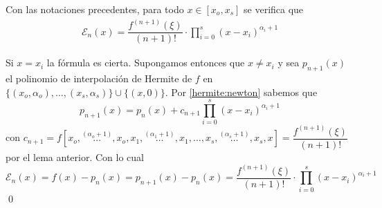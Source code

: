       \begin{teo}
        Con las notaciones precedentes, para todo $x\in[x_o,x_s]$ se verifica que
        \begin{align}
          \mathcal{E}_n(x)=\dfrac{f^{(n+1)}(\xi)}{(n+1)!}\cdot \prod_{i=0}^s(x-x_i)^{\alpha_i+1}
          \label{error:herm}
        \end{align}
        
      \end{teo}
      \begin{dem}
        Si $x=x_i$ la fórmula es cierta. Supongamos entonces que $x\neq x_i$ y sea $p_{n+1}(x)$ el polinomio de interpolación de Hermite de $f$ en $\{(x_o,\alpha_o),\ldots,(x_s,\alpha_s)\}\cup \{(x,0)\}$. Por \ref{hermite:newton} sabemos que
        $$p_{n+1}(x)=p_n(x)+c_{n+1}\prod_{i=0}^s(x-x_i)^{\alpha_i+1}$$
        con $c_{n+1}=f[x_o,\overset{(\alpha_o+1)}{\ldots},x_o,x_1,\overset{(\alpha_1+1)}{\ldots},x_1,\ldots,x_s,\overset{(\alpha_s+1)}{\ldots},x_s,x]=\dfrac{f^{(n+1)}(\xi)}{(n+1)!}$ por el lema anterior.
        Con lo cual
        $$\mathcal{E}_n(x)=f(x)-p_n(x)=p_{n+1}(x)-p_n(x)=\dfrac{f^{(n+1)}(\xi)}{(n+1)!}\cdot \prod_{i=0}^s(x-x_i)^{\alpha_i+1}$$
      \qed\end{dem}
        
